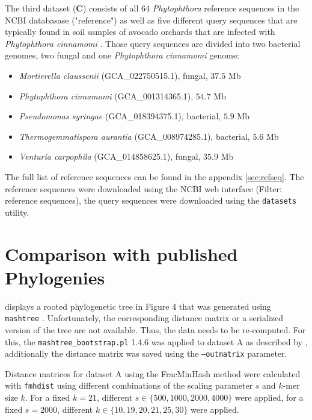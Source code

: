 The third dataset (\textbf{C}) consists of all 64 \textit{Phytophthora}
reference sequences in the NCBI databasase ("reference") as well as five
different query sequences that are typically found in soil samples of avocado
orchards that are infected with \textit{Phytophthora cinnamomi}
\cite{solis-garciaPhytophthoraRootRot2020}. Those query sequences are divided
into two bacterial genomes, two fungal and one \textit{Phytophthora cinnamomi}
genome:

\begin{itemize}
  \item \textit{Mortierella claussenii} (GCA\_022750515.1), fungal, $37.5$ Mb
  \item \textit{Phytophthora cinnamomi} (GCA\_001314365.1), $54.7$ Mb  
  \item \textit{Pseudomonas syringae} (GCA\_018394375.1), bacterial, $5.9$ Mb
  \item \textit{Thermogemmatispora aurantia} (GCA\_008974285.1), bacterial, $5.6$ Mb
  \item \textit{Venturia carpophila} (GCA\_014858625.1), fungal, $35.9$ Mb
\end{itemize}

The full list of reference sequences can be found in the appendix
\ref{sec:refseq}. The reference sequences were downloaded using the NCBI web
interface (Filter: reference sequences), the query sequences were downloaded
using the \texttt{datasets} \cite{sayersDatabaseResourcesNational2022} utility.



\section{Comparison with published Phylogenies}
\cite{mandalComparativeGenomeAnalysis2022} displays a rooted phylogenetic tree
in Figure 4 that was generated using \texttt{mashtree}
\cite{katzMashtreeRapidComparison2019,ondovMashFastGenome2016}. Unfortunately,
the corresponding distance matrix or a serialized version of the tree are not
available. Thus, the data needs to be re-computed. For this, the
\texttt{mashtree\_bootstrap.pl} 1.4.6 was applied to dataset A as described by
\cite{mandalComparativeGenomeAnalysis2022}, additionally the distance matrix was
saved using the \texttt{--outmatrix} parameter.

Distance matrices for dataset A using the FracMinHash method
\cite{heraDerivingConfidenceIntervals2023,irberLightweightCompositionalAnalysis2022}
were calculated with \texttt{fmhdist} using different combinations of the
scaling parameter $s$ and $k$-mer size $k$. For a fixed $k=21$, different $s \in
\{500, 1000, 2000, 4000\}$ were applied, for a fixed $s=2000$, different $k \in
\{10, 19, 20, 21, 25, 30\}$ were applied.

